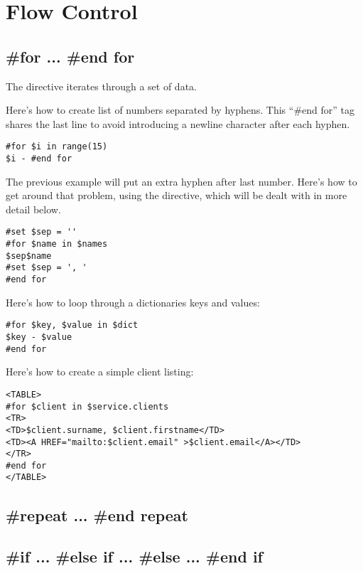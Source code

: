 \section{Flow Control}
\label{flowControl}


\subsection{\#for ... \#end for}
\label{flowControl.for}

The  directive iterates through a set of data.

Here's how to create list of numbers separated by hyphens. This ``\#end for''
tag shares the last line to avoid introducing a newline character after each
hyphen.  
\begin{verbatim}
#for $i in range(15)
$i - #end for
\end{verbatim}

The previous example will put an extra hyphen after last number.  Here's how to
get around that problem, using the  directive, which will be dealt
with in more detail below.
\begin{verbatim}
#set $sep = '' 
#for $name in $names 
$sep$name 
#set $sep = ', ' 
#end for 
\end{verbatim}

Here's how to loop through a dictionaries keys and values:
\begin{verbatim}
#for $key, $value in $dict
$key - $value
#end for
\end{verbatim}

Here's how to create a simple client listing:
\begin{verbatim}
<TABLE>
#for $client in $service.clients
<TR>
<TD>$client.surname, $client.firstname</TD>
<TD><A HREF="mailto:$client.email" >$client.email</A></TD>
</TR>
#end for
</TABLE>
\end{verbatim}


\subsection{\#repeat ... \#end repeat}
\label{flowControl.repeat}


\subsection{\#if ... \#else if ... \#else ... \#end if}
\label{flowControl.if}

